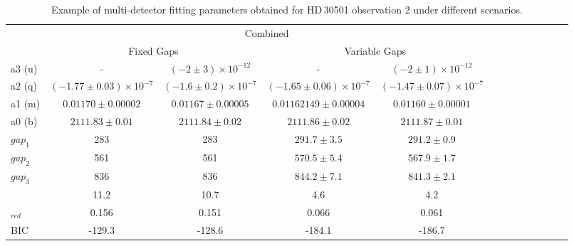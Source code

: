 \begin{table}
    \small
    \caption[Example of multi-detector fitting parameters and correlation.]{Example of multi-detector fitting parameters obtained for HD\,30501 observation 2 under different scenarios.}
    \begin{tabular}{|l|c|c|c|c|c|c|c|c|c|c|c|c|}
        \toprule
        & \multicolumn{4}{c|}{Combined}  \\
        & \multicolumn{2}{c|}{Fixed Gaps} & \multicolumn{2}{c|}{Variable Gaps} \\ \midrule
        a3 (u) & - & $(-2\pm 3) \times 10^{-12}$ & - & $(-2 \pm 1)\times 10^{-12}$ \\
        a2 (q) & $(-1.77 \pm 0.03) \times 10^{-7}$ & $(-1.6 \pm 0.2)\times 10^{-7}$ & $(-1.65 \pm 0.06) \times 10^{-7}$ & $(-1.47 \pm 0.07)\times 10^{-7}$ \\
        a1 (m) & $0.01170 \pm 0.00002$ & $0.01167 \pm 0.00005$ & $0.01162149 \pm 0.00004$ & $0.01160 \pm 0.00001$  \\
        a0 (b) & $2111.83 \pm 0.01$ & $2111.84 \pm 0.02$ & $2111.86 \pm 0.02$ & $2111.87 \pm 0.01$ \\
        \(gap_{1}\) & 283 & 283 & $291.7 \pm 3.5$ & $291.2 \pm 0.9$ \\
        \(gap_{2}\) & 561 & 561 & $570.5 \pm 5.4$ & $567.9 \pm 1.7$ \\
        \(gap_{3}\) & 836 & 836 & $844.2 \pm 7.1$ & $841.3 \pm 2.1$ \\
        \textchisquared{} & 11.2 & 10.7 & 4.6 & 4.2 \\
        \textchisquared{}$_{red}$ & 0.156 & 0.151 & 0.066 & 0.061 \\
        BIC & -129.3 & -128.6 & -184.1 & -186.7 \\
        \bottomrule
    \end{tabular}\label{tab:example_calibration_parameters}
\end{table}